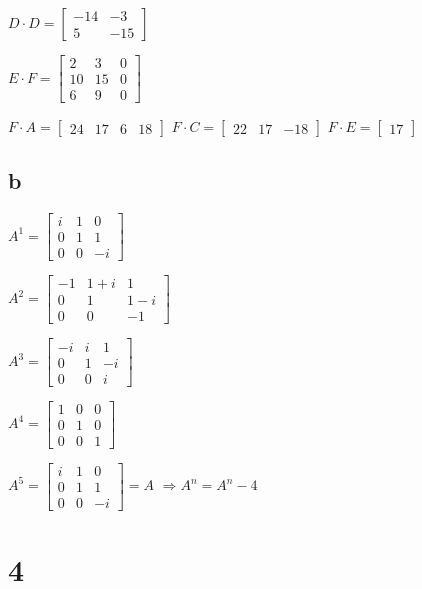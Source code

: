 \documentclass{article}
\begin{document}
$D\cdot D=\begin{bmatrix}
    -14&-3\\
    5&-15
\end{bmatrix}$


$E\cdot F=\begin{bmatrix}
    2&3&0\\
    10&15&0\\
    6&9&0
\end{bmatrix}$


$F\cdot A=\begin{bmatrix}
    24&17&6&18
\end{bmatrix}$
$F\cdot C=\begin{bmatrix}
    22&17&-18
\end{bmatrix}$
$F\cdot E=\begin{bmatrix}
    17
\end{bmatrix}$
\subsection*{b}
$A^1=\begin{bmatrix}
    i&1&0\\
    0&1&1\\
    0&0&-i
\end{bmatrix}$


$A^2=\begin{bmatrix}
    -1&1+i&1\\
    0&1&1-i\\
    0&0&-1
\end{bmatrix}$


$A^3=\begin{bmatrix}
    -i&i&1\\
    0&1&-i\\
    0&0&i
\end{bmatrix}$


$A^4=\begin{bmatrix}
    1&0&0\\
    0&1&0\\
    0&0&1
\end{bmatrix}$

$A^5=\begin{bmatrix}
    i&1&0\\
    0&1&1\\
    0&0&-i
\end{bmatrix}=A$
$\Rightarrow A^n=A^n-4$

\section*{4}
\end{document}
